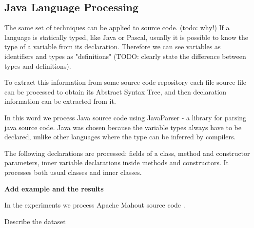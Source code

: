 \subsection{Java Language Processing} \label{sec:jlp}

The same set of techniques can be applied to source code.
(todo: why!)
If a language 
is statically typed, like Java or Pascal, usually it is possible to know the
type of a variable from its declaration. Therefore we can see 
variables as identifiers and types as "definitions" (TODO: clearly state 
the difference between types and definitions).

To extract this information from some source code repository each file source
file can be processed to obtain its Abstract Syntax Tree, and then 
declaration information can be extracted from it. 


In this word we process Java source code using JavaParser \cite{javaparser} - 
a library for parsing java source code. Java was chosen because the variable 
types always have to be declared, unlike other languages where the type 
can be inferred by compilers. 

The following declarations are processed: fields of a class, method and 
constructor parameters, inner variable declarations inside 
methods and constructors. It processes both usual classes and inner classes. 

\textbf{Add example and the results}


In the experiments we process Apache Mahout source code \cite{mahout}. 

Describe the dataset

